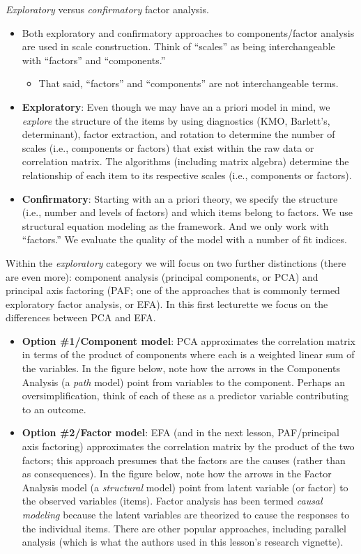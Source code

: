 \documentclass[
  english,
]{book}
\providecommand{\tightlist}{%
  \setlength{\itemsep}{0pt}\setlength{\parskip}{0pt}}
\begin{document}
\emph{Exploratory} versus \emph{confirmatory} factor analysis.

\begin{itemize}
\item
  Both exploratory and confirmatory approaches to components/factor analysis are used in scale construction. Think of ``scales'' as being interchangeable with ``factors'' and ``components.''

  \begin{itemize}
  \tightlist
  \item
    That said, ``factors'' and ``components'' are not interchangeable terms.
  \end{itemize}
\item
  \textbf{Exploratory}: Even though we may have an a priori model in mind, we \emph{explore} the structure of the items by using diagnostics (KMO, Barlett's, determinant), factor extraction, and rotation to determine the number of scales (i.e., components or factors) that exist within the raw data or correlation matrix. The algorithms (including matrix algebra) determine the relationship of each item to its respective scales (i.e., components or factors).
\item
  \textbf{Confirmatory}: Starting with an a priori theory, we specify the structure (i.e., number and levels of factors) and which items belong to factors. We use structural equation modeling as the framework. And we only work with ``factors.'' We evaluate the quality of the model with a number of fit indices.
\end{itemize}

Within the \emph{exploratory} category we will focus on two further distinctions (there are even more): component analysis (principal components, or PCA) and principal axis factoring (PAF; one of the approaches that is commonly termed exploratory factor analysis, or EFA). In this first lecturette we focus on the differences between PCA and EFA.

\begin{itemize}
\item
  \textbf{Option \#1/Component model}: PCA approximates the correlation matrix in terms of the product of components where each is a weighted linear sum of the variables. In the figure below, note how the arrows in the Components Analysis (a \emph{path} model) point from variables to the component. Perhaps an oversimplification, think of each of these as a predictor variable contributing to an outcome.
\item
  \textbf{Option \#2/Factor model}: EFA (and in the next lesson, PAF/principal axis factoring) approximates the correlation matrix by the product of the two factors; this approach presumes that the factors are the causes (rather than as consequences). In the figure below, note how the arrows in the Factor Analysis model (a \emph{structural} model) point from latent variable (or factor) to the observed variables (items). Factor analysis has been termed \emph{causal modeling} because the latent variables are theorized to cause the responses to the individual items. There are other popular approaches, including parallel analysis (which is what the authors used in this lesson's research vignette).
\end{itemize}
\end{document}
